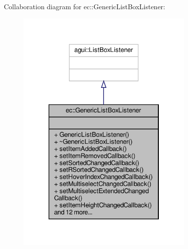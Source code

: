 Collaboration diagram for ec\+:\+:Generic\+List\+Box\+Listener\+:\nopagebreak
\begin{figure}[H]
\begin{center}
\leavevmode
\includegraphics[width=248pt]{classec_1_1_generic_list_box_listener__coll__graph}
\end{center}
\end{figure}

